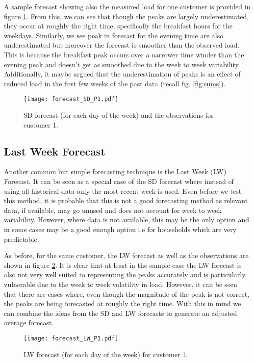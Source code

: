 A sample forecast showing also the measured load for one customer is provided in figure \ref{fig:SDforecast}. From this, we can see that though the peaks are largely underestimated, they occur at roughly the right time, specifically the breakfast hours for the weekdays. Similarly, we see peak in forecast for the evening time are also underestimated but moreover the forecast is smoother than the observed load. This is because the breakfast peak occurs over a narrower time winder than the evening peak and doesn't get as smoothed due to the week to week variability. Additionally, it maybe argued that the underestimation of peaks is an effect of reduced load in the first few weeks of the past data (recall fig. \ref{fig:sums}).

\begin{figure}
\centering
\texttt{[image: forecast\_SD\_P1.pdf]}
\caption{SD forecast (for each day of the week) and the observations for customer 1.}
\label{fig:SDforecast} 
\end{figure}

\subsection{Last Week Forecast}

Another common but simple forecasting technique is the Last Week (LW) Forecast. It can be seen as a special case of the SD forecast where instead of using all historical data only the most recent week is used. Even before we test this method, it is probable that this is not a good forecasting method as relevant data, if available, may go unused and does not account for week to week variability. However, where data is not available, this may be the only option and in some cases may be a good enough option i.e for households which are very predictable.

As before, for the same customer, the LW forecast as well as the observations are shown in figure \ref{fig:LW_forecast_P1}. It is clear that at least in the sample case the LW forecast is also not very well suited to representing the peaks accurately and is particularly vulnerable due to the week to week volatility in load. However, it can be seen that there are cases where, even though the magnitude of the peak is not correct, the peaks are being forecasted at roughly the right time. With this in mind we can combine the ideas from the SD and LW forecasts to generate an adjusted average forecast.

\begin{figure}
\texttt{[image: forecast\_LW\_P1.pdf]}
\caption{LW forecast (for each day of the week) for customer 1.}
\label{fig:LW_forecast_P1} 
\end{figure}


